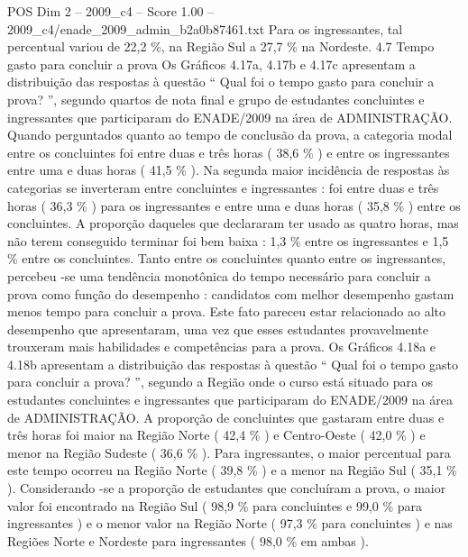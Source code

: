 \begin{textsample}{POS Dim 2 – 2009\_c4 – Score 1.00 – 2009\_c4/enade\_2009\_admin\_b2a0b87461.txt}
Para os ingressantes, tal percentual variou de 22,2 \%, na Região Sul a 27,7 \% na Nordeste. 4.7 Tempo gasto para concluir a prova Os Gráficos 4.17a, 4.17b e 4.17c apresentam a distribuição das respostas à questão “ Qual foi o tempo gasto para concluir a prova? ”, segundo quartos de nota final e grupo de estudantes concluintes e ingressantes que participaram do ENADE/2009 na área de ADMINISTRAÇÃO.
Quando perguntados quanto ao tempo de conclusão da prova, a categoria modal entre os concluintes foi entre duas e três horas ( 38,6 \% ) e entre os ingressantes entre uma e duas horas ( 41,5 \% ).
Na segunda maior incidência de respostas às categorias se inverteram entre concluintes e ingressantes : foi entre duas e três horas ( 36,3 \% ) para os ingressantes e entre uma e duas horas ( 35,8 \% ) entre os concluintes.
A proporção daqueles que declararam ter usado as quatro horas, mas não terem conseguido terminar foi bem baixa : 1,3 \% entre os ingressantes e 1,5 \% entre os concluintes.
Tanto entre os concluintes quanto entre os ingressantes, percebeu -se uma tendência monotônica do tempo necessário para concluir a prova como função do desempenho : candidatos com melhor desempenho gastam menos tempo para concluir a prova.
Este fato pareceu estar relacionado ao alto desempenho que apresentaram, uma vez que esses estudantes provavelmente trouxeram mais habilidades e competências para a prova.
Os Gráficos 4.18a e 4.18b apresentam a distribuição das respostas à questão “ Qual foi o tempo gasto para concluir a prova? ”, segundo a Região onde o curso está situado para os estudantes concluintes e ingressantes que participaram do ENADE/2009 na área de ADMINISTRAÇÃO.
A proporção de concluintes que gastaram entre duas e três horas foi maior na Região Norte ( 42,4 \% ) e Centro-Oeste ( 42,0 \% ) e menor na Região Sudeste ( 36,6 \% ).
Para ingressantes, o maior percentual para este tempo ocorreu na Região Norte ( 39,8 \% ) e a menor na Região Sul ( 35,1 \% ).
Considerando -se a proporção de estudantes que concluíram a prova, o maior valor foi encontrado na Região Sul ( 98,9 \% para concluintes e 99,0 \% para ingressantes ) e o menor valor na Região Norte ( 97,3 \% para concluintes ) e nas Regiões Norte e Nordeste para ingressantes ( 98,0 \% em ambas ).

\end{textsample}
